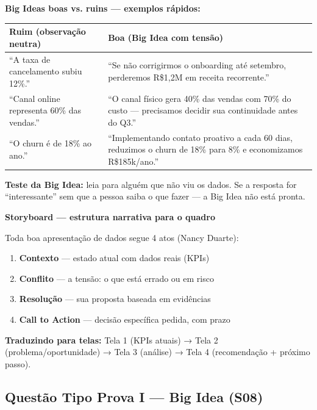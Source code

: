 \begin{SolvedBox}
\textbf{Big Ideas boas vs. ruins — exemplos rápidos:}

\begin{tabular}{|p{5.5cm}|p{6.5cm}|}
\hline
\textbf{Ruim (observação neutra)} & \textbf{Boa (Big Idea com tensão)} \\
\hline
``A taxa de cancelamento subiu 12\%.'' &
``Se não corrigirmos o onboarding até setembro, perderemos R\$1,2M em receita recorrente.'' \\
\hline
``Canal online representa 60\% das vendas.'' &
``O canal físico gera 40\% das vendas com 70\% do custo — precisamos decidir sua continuidade antes do Q3.'' \\
\hline
``O churn é de 18\% ao ano.'' &
``Implementando contato proativo a cada 60 dias, reduzimos o churn de 18\% para 8\% e economizamos R\$185k/ano.'' \\
\hline
\end{tabular}

\textbf{Teste da Big Idea:} leia para alguém que não viu os dados. Se a resposta
for ``interessante'' sem que a pessoa saiba o que fazer — a Big Idea não está pronta.
\end{SolvedBox}

\begin{BoardBox}
\textbf{Storyboard — estrutura narrativa para o quadro}

Toda boa apresentação de dados segue 4 atos (Nancy Duarte):
\begin{enumerate}
  \item \textbf{Contexto} — estado atual com dados reais (KPIs)
  \item \textbf{Conflito} — a tensão: o que está errado ou em risco
  \item \textbf{Resolução} — sua proposta baseada em evidências
  \item \textbf{Call to Action} — decisão específica pedida, com prazo
\end{enumerate}

\textbf{Traduzindo para telas:}
Tela 1 (KPIs atuais) → Tela 2 (problema/oportunidade) → Tela 3 (análise) → Tela 4 (recomendação + próximo passo).
\end{BoardBox}

\subsection{Questão Tipo Prova I — Big Idea (S08)}

